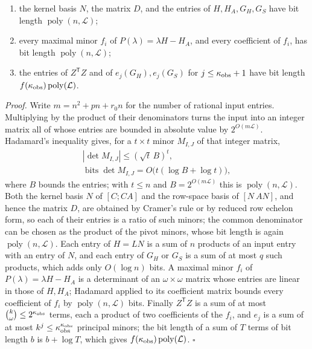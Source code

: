\documentclass[journal]{IEEEtran}
\theoremstyle{plainn}
\begin{document}
\begin{enumerate}
\item the kernel basis $N$, the matrix $D$, and the entries of $H,H_A,G_H,G_S$ have bit length $\operatorname{poly}(n,\mathcal L)$;
\item every maximal minor $f_i$ of $P(\lambda)=\lambda H-H_A$, and every coefficient of $f_i$, has bit length $\operatorname{poly}(n,\mathcal L)$;
\item the entries of $Z^{\mathsf T}Z$ and of $e_j(G_H),e_j(G_S)$ for $j\le\kappa_{\rm obs}+1$ have bit length $f(\kappa_{\rm obs})\operatorname{poly}(\mathcal L)$.
\end{enumerate}
\emph{Proof.} Write $m=n^2+pn+r_0n$ for the number of rational input entries. Multiplying by the product of their denominators turns the input into an integer matrix all of whose entries are bounded in absolute value by $2^{O(m\mathcal L)}$. Hadamard's inequality gives, for a $t\times t$ minor $M_{I,J}$ of that integer matrix,
\begin{equation}
\begin{gathered}|\det M_{I,J}|\le(\sqrt t\,B)^t,\\\operatorname{bits}\det M_{I,J}=O\bigl(t(\log B+\log t)\bigr),\end{gathered}
\end{equation}
where $B$ bounds the entries; with $t\le n$ and $B=2^{O(m\mathcal L)}$ this is $\operatorname{poly}(n,\mathcal L)$. Both the kernel basis $N$ of $[C;CA]$ and the row-space basis of $[N\ AN]$, and hence the matrix $D$, are obtained by Cramer's rule or by reduced row echelon form, so each of their entries is a ratio of such minors; the common denominator can be chosen as the product of the pivot minors, whose bit length is again $\operatorname{poly}(n,\mathcal L)$. Each entry of $H=LN$ is a sum of $n$ products of an input entry with an entry of $N$, and each entry of $G_H$ or $G_S$ is a sum of at most $q$ such products, which adds only $O(\log n)$ bits. A maximal minor $f_i$ of $P(\lambda)=\lambda H-H_A$ is a determinant of an $\omega\times\omega$ matrix whose entries are linear in those of $H,H_A$; Hadamard applied to its coefficient matrix bounds every coefficient of $f_i$ by $\operatorname{poly}(n,\mathcal L)$ bits. Finally $Z^{\mathsf T}Z$ is a sum of at most $\binom{k}{\omega}\le2^{\kappa_{\rm obs}}$ terms, each a product of two coefficients of the $f_i$, and $e_j$ is a sum of at most $k^{j}\le\kappa_{\rm obs}^{\kappa_{\rm obs}}$ principal minors; the bit length of a sum of $T$ terms of bit length $b$ is $b+\log T$, which gives $f(\kappa_{\rm obs})\operatorname{poly}(\mathcal L)$. $\square$
\end{document}
